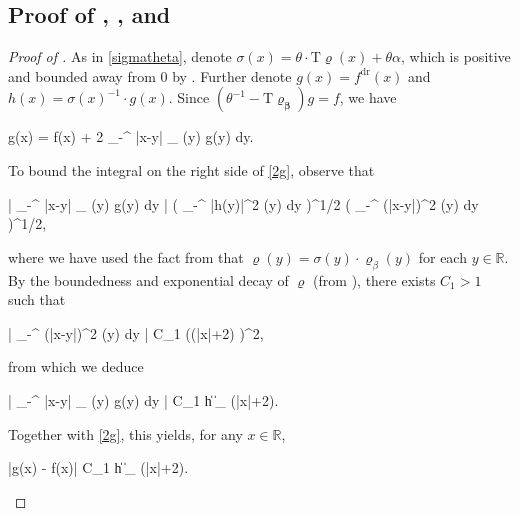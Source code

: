 \documentclass{amsart}
\numberwithin{equation}{section}
\DeclareMathOperator{\dr}{dr}
\theoremstyle{remark}
\theoremstyle{definition}
\begin{document}
	
	\subsection{Proof of , , and }
	
	\label{DerivativefProof} 
	
	\begin{proof}[Proof of ]
		
		As in \eqref{sigmatheta}, denote $\sigma (x) = \theta \cdot \bm{\mathrm{T}} \varrho (x) + \theta \alpha$, which is positive and bounded away from $0$ by . Further denote $g(x) = f^{\dr} (x)$ and $h(x) = \sigma(x)^{-1} \cdot g(x)$. Since $(\theta^{-1} - \bm{\mathrm{T} \varrho_{\beta}}) g = f$, we have
		\begin{flalign}
			\label{2g} 
			g(x) = \theta f(x) + 2 \theta \displaystyle\int_{-\infty}^{\infty} \log |x-y| \varrho_{\beta} (y) g(y) dy.
		\end{flalign}
		
		\noindent To bound the integral on the right side of \eqref{2g}, observe that
		\begin{flalign*}
			\Bigg| \displaystyle\int_{-\infty}^{\infty} \log |x-y| \varrho_{\beta} (y) g(y) dy \Bigg| \le \Bigg( \displaystyle\int_{-\infty}^{\infty} |h(y)|^2 \varrho (y) dy \Bigg)^{1/2} \Bigg( \displaystyle\int_{-\infty}^{\infty} (\log |x-y|)^2 \varrho (y) dy \Bigg)^{1/2},
		\end{flalign*}
		
		\noindent where we have used the fact from  that $\varrho (y) = \sigma(y) \cdot \varrho_{\beta} (y)$ for each $y \in \mathbb{R}$. By the boundedness and exponential decay of $\varrho$ (from ), there exists $C_1 > 1$ such that 
		\begin{flalign*}
			\Bigg| \displaystyle\int_{-\infty}^{\infty} (\log |x-y|)^2 \varrho (y) dy \Bigg| \le C_1 (\log (|x|+2) )^2,
		\end{flalign*}
		
		\noindent from which we deduce
		\begin{flalign*}
			\Bigg| \displaystyle\int_{-\infty}^{\infty} \log |x-y| \varrho_{\beta} (y) g(y) dy \Bigg| \le  C_1 \| h \|_{} \cdot \log (|x|+2).
		\end{flalign*}
	
		
		\noindent Together with \eqref{2g}, this yields, for any $x \in \mathbb{R}$,
		\begin{flalign}
			\label{gh} 
				|g(x) - \theta f(x)|  \theta C_1 \| h \|_{} \cdot \log (|x|+2). 
		\end{flalign}
		

\end{proof}
\end{document}
